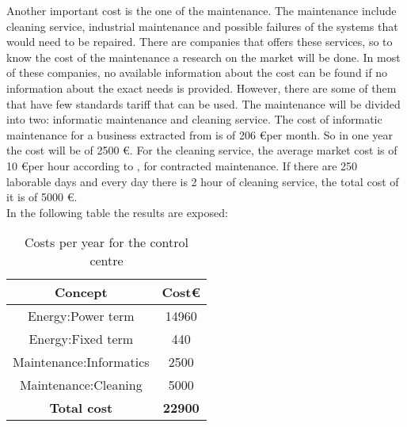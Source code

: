 \documentclass[12pt,a4paper]{report}
\begin{document}
Another important cost is the one of the maintenance. The maintenance include cleaning service, industrial maintenance and possible failures of the systems that would need to be repaired. There are companies that offers these services, so to know the cost of the maintenance a research on the market will be done. In most of these companies, no available information about the cost can be found if no information about the exact needs is provided. However, there are some of them that have few standards tariff that can be used. The maintenance will be divided into two: informatic maintenance and cleaning service. The cost of informatic maintenance for a business extracted from \cite{inf} is of 206 \euro per month. So in one year the cost will be of 2500 \euro. For the cleaning service, the average market cost is of 10 \euro per hour according to \cite{clean}, for contracted maintenance. If there are 250 laborable days and every day there is 2 hour of cleaning service, the total cost of it is of 5000 \euro. \\
In the following table the results are exposed:
\begin{table}[H]
\begin{center}
\begin{tabular}{|c|c|}
\hline
\textbf{Concept}&\textbf{Cost\euro}\\
\hline
Energy:Power term&14960\\
\hline
Energy:Fixed term&440\\
\hline
Maintenance:Informatics&2500\\
\hline
Maintenance:Cleaning&5000\\
\hline
\textbf{Total cost}&\textbf{22900}\\
\hline
\end{tabular}
\caption{Costs per year for the control centre}
\end{center}
\end{table}
\end{document}
